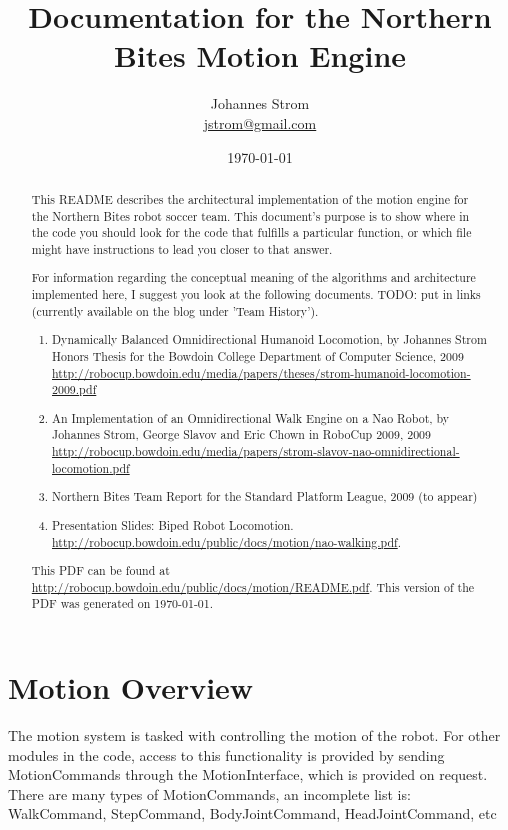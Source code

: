 \documentclass[11pt]{article}
\title{Documentation for the Northern Bites Motion Engine}
\author{Johannes Strom\\
\url{jstrom@gmail.com}}
\date{\today}
\begin{document}
\maketitle

\begin{abstract}
This README describes the architectural implementation of the motion engine for
the Northern Bites robot soccer team. This document's purpose is to show where
in the code you should look for the code that fulfills a particular function,
or which file might have instructions to lead you closer to that answer.

For information regarding the conceptual meaning of the algorithms and
architecture implemented here, I suggest you look at the following documents. TODO: put in links (currently available on the blog under 'Team History').
\begin{enumerate}
\item Dynamically Balanced Omnidirectional Humanoid Locomotion, by Johannes Strom
   Honors Thesis for the Bowdoin College Department of Computer Science, 2009
\url{http://robocup.bowdoin.edu/media/papers/theses/strom-humanoid-locomotion-2009.pdf}
\item  An Implementation of an Omnidirectional Walk Engine on a Nao Robot, by
   Johannes Strom, George Slavov and Eric Chown in RoboCup 2009, 2009
\url{http://robocup.bowdoin.edu/media/papers/strom-slavov-nao-omnidirectional-locomotion.pdf}
\item Northern Bites Team Report for the Standard Platform League, 2009 (to appear)
\item Presentation Slides: Biped Robot Locomotion.  \url{http://robocup.bowdoin.edu/public/docs/motion/nao-walking.pdf}.
\end{enumerate}

This PDF can be found at \url{http://robocup.bowdoin.edu/public/docs/motion/README.pdf}.
This version of the PDF was generated on \today.
\end{abstract}

\tableofcontents

\section{Motion Overview}
The motion system is tasked with controlling the motion of the robot. For other
modules in the code, access to this functionality is provided by sending
MotionCommands through the MotionInterface, which is provided on request.
There are many types of MotionCommands, an incomplete list is:
   WalkCommand, StepCommand, BodyJointCommand, HeadJointCommand, etc
\end{document}
